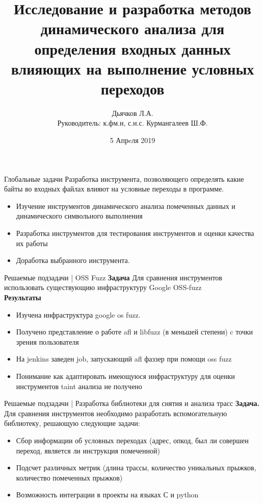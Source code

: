 \documentclass[10pt]{beamer}
\title{Исследование и разработка методов динамического анализа для определения входных данных влияющих на выполнение условных переходов}
\author{Дьячков Л.А.\\[10mm]{\small Руководитель: к.ф\-м.н, с.н.с. Курмангалеев Ш.Ф.}}
\institute{ИСП РАН}
\date{5 Апрeля 2019}
\begin{document}
\maketitle

\begin{frame}{Глобальные задачи}
    Разработка инструмента, позволяющего определять какие байты во входных файлах влияют на условные переходы в программе. 
    \begin{itemize}
      \item Изучение инструментов динамического анализа помеченных данных и динамического символьного выполнения
      \item Разработка инструментов для тестирования инструментов и оценки качества их работы
      \item Доработка выбранного инструмента.
    \end{itemize}
\end{frame}

\begin{frame}{Решаемые подзадачи | OSS Fuzz}
    \textbf{Задача} Для сравнения инструментов использовать существующию инфраструктуру Google OSS-fuzz \\
    \textbf{Результаты}
    \begin{itemize}
      \item Изучена инфраструктура google os fuzz.
      \item Получено представление о работе afl и libfuzz (в меньшей степени) c точки зрения пользователя
      \item На jenkins заведен job, запускающий afl фаззер при помощи oss fuzz
      \item Понимание как адаптировать имеющуюся инфраструктуру для оценки инструментов taint анализа не получено
    \end{itemize}
\end{frame}

\begin{frame}{Решаемые подзадачи | Разработка библиотеки для снятия и анализа трасс}
    \textbf{Задача.} Для сравнения инструментов необходимо разработать вспомогательную библиотеку, решающую следующие задачи:
    \begin{itemize}
      \item Сбор информации об условных переходах (адрес, опкод, был ли совершен переход, является ли инструкция помеченной)
      \item Подсчет различных метрик (длина трассы, количество уникальных прыжков, количество помеченных прыжков)
      \item Возможность интеграции в проекты на языках С и python
    \end{itemize}
  \end{frame}
\end{document}
